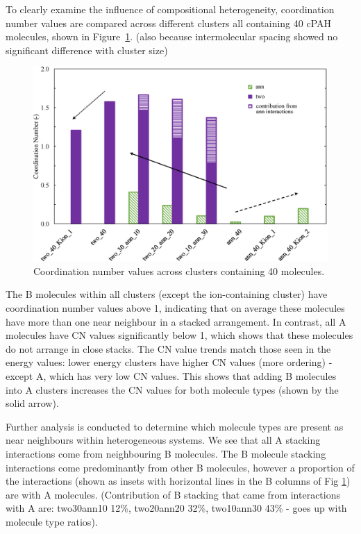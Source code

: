 To clearly examine the influence of compositional heterogeneity, coordination number values are compared across different clusters all containing 40 cPAH molecules, shown in Figure~\ref{fig:coordination_numbers}. (also because intermolecular spacing showed no significant difference with cluster size) %
%
\begin{figure}[!tbh]
\centering
\includegraphics[width=0.8\linewidth]{Figures/CN_bar_chart.eps}
\caption{Coordination number values across clusters containing 40 molecules.}
\label{fig:coordination_numbers}
\end{figure}
%
The B molecules within all clusters (except the ion-containing cluster) have coordination number values above 1, indicating that on average these molecules have more than one near neighbour in a stacked arrangement. In contrast, all A molecules have CN values significantly below 1, which shows that these molecules do not arrange in close stacks. The CN value trends match those seen in the energy values: lower energy clusters have higher CN values (more ordering) - except A, which has very low CN values. %
This shows that adding B molecules into A clusters increases the CN values for both molecule types (shown by the solid arrow).

Further analysis is conducted to determine which molecule types are present as near neighbours within heterogeneous systems.  We see that all A stacking interactions come from neighbouring B molecules.  The B molecule stacking interactions come predominantly from other B molecules, however a proportion of the interactions (shown as insets with horizontal lines in the B columns of Fig \ref{fig:coordination_numbers}) are with A molecules.  (Contribution of B stacking that came from interactions with A are: two30ann10 12\%, two20ann20 32\%, two10ann30 43\% - goes up with molecule type ratios).


